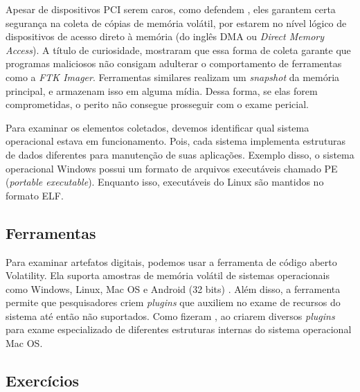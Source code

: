     \vspace{4mm}
    
    \hspace{1cm}
    Apesar de dispositivos PCI serem caros, como defendem , eles garantem certa segurança na coleta de cópias de memória volátil, por estarem no nível lógico de dispositivos de acesso direto à memória (do inglês DMA ou \textit{Direct Memory Access}). A título de curiosidade,  mostraram que essa forma de coleta garante que programas maliciosos não consigam adulterar o comportamento de ferramentas como a \textit{FTK Imager}. Ferramentas similares realizam um \textit{snapshot} da memória principal, e armazenam isso em alguma mídia. Dessa forma, se elas forem comprometidas, o perito não consegue prosseguir com o exame pericial.
    
    \vspace{4mm}
    
    \hspace{1cm}
    Para examinar os elementos coletados, devemos identificar qual sistema operacional estava em funcionamento. Pois, cada sistema implementa estruturas de dados diferentes para manutenção de suas aplicações. Exemplo disso, o sistema operacional Windows possui um formato de arquivos executáveis chamado PE (\textit{portable executable}). Enquanto isso, executáveis do Linux são mantidos no formato ELF.
   
    \subsection{Ferramentas}

    \hspace{1cm}
    Para examinar artefatos digitais, podemos usar a ferramenta de código aberto Volatility. Ela suporta amostras de memória volátil de sistemas operacionais como Windows, Linux, Mac OS e Android (32 bits) \cite{ligh2014}. Além disso, a ferramenta permite que pesquisadores criem \textit{plugins} que auxiliem no exame de recursos do sistema até então não suportados. Como fizeram , ao criarem diversos \textit{plugins} para exame especializado de diferentes estruturas internas do sistema operacional Mac OS.

    \subsection{Exercícios}
    
